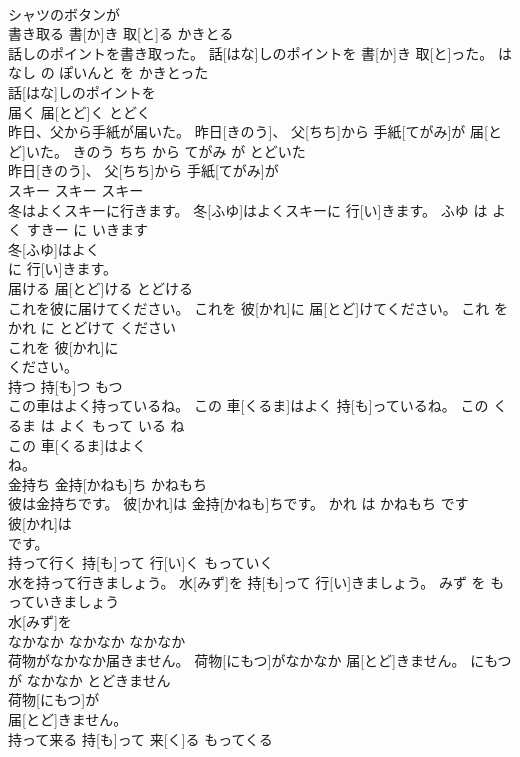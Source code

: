 \documentclass[8pt]{extreport}
\begin{document}
\begin{CJK}{UTF8}{min}
\\	シャツのボタンが
\\	書き取る	書[か]き 取[と]る	かきとる	
\\	話しのポイントを書き取った。	話[はな]しのポイントを 書[か]き 取[と]った。	はなし の ぽいんと を かきとった	
\\	話[はな]しのポイントを
\\	届く	届[とど]く	とどく	
\\	昨日、父から手紙が届いた。	昨日[きのう]、 父[ちち]から 手紙[てがみ]が 届[とど]いた。	きのう ちち から てがみ が とどいた	
\\	昨日[きのう]、 父[ちち]から 手紙[てがみ]が
\\	スキー	スキー	スキー	
\\	冬はよくスキーに行きます。	冬[ふゆ]はよくスキーに 行[い]きます。	ふゆ は よく すきー に いきます	
\\	冬[ふゆ]はよく
\\	に 行[い]きます。		
\\	届ける	届[とど]ける	とどける	
\\	これを彼に届けてください。	これを 彼[かれ]に 届[とど]けてください。	これ を かれ に とどけて ください	
\\	これを 彼[かれ]に
\\	ください。		
\\	持つ	持[も]つ	もつ	
\\	この車はよく持っているね。	この 車[くるま]はよく 持[も]っているね。	この くるま は よく もって いる ね	
\\	この 車[くるま]はよく
\\	ね。		
\\	金持ち	金持[かねも]ち	かねもち	
\\	彼は金持ちです。	彼[かれ]は 金持[かねも]ちです。	かれ は かねもち です	
\\	彼[かれ]は
\\	です。		
\\	持って行く	持[も]って 行[い]く	もっていく	
\\	水を持って行きましょう。	水[みず]を 持[も]って 行[い]きましょう。	みず を もっていきましょう	
\\	水[みず]を
\\	なかなか	なかなか	なかなか	
\\	荷物がなかなか届きません。	荷物[にもつ]がなかなか 届[とど]きません。	にもつ が なかなか とどきません	
\\	荷物[にもつ]が
\\	届[とど]きません。		
\\	持って来る	持[も]って 来[く]る	もってくる	

\end{CJK}
\end{document}
